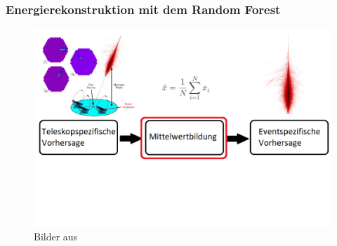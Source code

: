 \documentclass[aspectratio=1610, professionalfonts, 9pt]{beamer}
\begin{document}
  \begin{frame}
    \frametitle{Energierekonstruktion mit dem Random Forest}
    \begin{figure}
      \includegraphics[width=\textwidth]{pictures/Ablauf11.png}
      \caption{Bilder aus~\cite{ablauf}}
      \label{}
    \end{figure}
  \end{frame}
\end{document}
